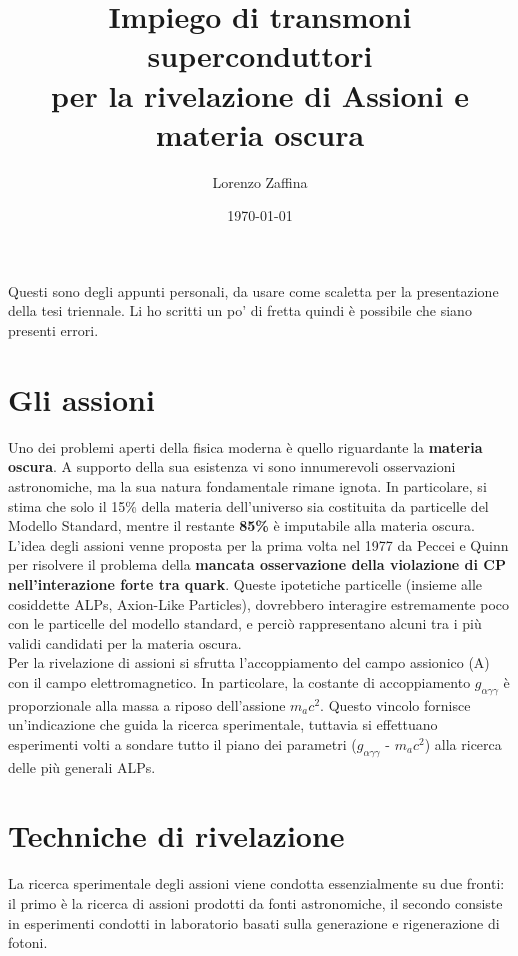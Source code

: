 \documentclass[10pt,a4paper]{article}
\author{Lorenzo Zaffina}
\title{Impiego di transmoni superconduttori\\ per la rivelazione di Assioni e materia oscura
}
\begin{document}
\date{\today}
\maketitle

Questi sono degli appunti personali, da usare come scaletta per la presentazione della tesi triennale. Li ho scritti un po' di fretta quindi è possibile che siano presenti errori.


\section{Gli assioni}

Uno dei problemi aperti della fisica moderna è quello riguardante la \textbf{materia oscura}. A supporto della sua esistenza vi sono innumerevoli osservazioni astronomiche, ma la sua natura fondamentale rimane ignota. In particolare, si stima che solo il 15\% della materia dell’universo sia costituita da particelle del Modello Standard, mentre il restante \textbf{85\%} è imputabile alla materia oscura.\\

L’idea degli assioni venne proposta per la prima volta nel 1977 da Peccei e Quinn per risolvere il problema della \textbf{mancata osservazione della violazione di CP nell’interazione forte tra quark}. Queste ipotetiche particelle (insieme alle cosiddette ALPs, Axion-Like Particles), dovrebbero interagire estremamente poco con le particelle del modello standard, e perciò rappresentano alcuni tra i più validi candidati per la materia oscura. \\

Per la rivelazione di assioni si sfrutta l’accoppiamento del campo assionico (A) con il campo elettromagnetico. In particolare, la costante di accoppiamento $g_{\alpha\gamma\gamma}$ è proporzionale alla massa a riposo dell’assione $m_ac^2$.  Questo vincolo fornisce un’indicazione che guida la ricerca sperimentale, tuttavia si effettuano esperimenti volti a sondare tutto il piano dei parametri ($g_{\alpha\gamma\gamma}$ - $m_ac^2$)  alla ricerca delle più generali ALPs.

\section{Techniche di rivelazione}

La ricerca sperimentale degli assioni viene condotta essenzialmente su due fronti: il primo è la ricerca di assioni prodotti da fonti astronomiche, il secondo consiste in esperimenti condotti in laboratorio basati sulla generazione e rigenerazione di fotoni.\\
\end{document}
